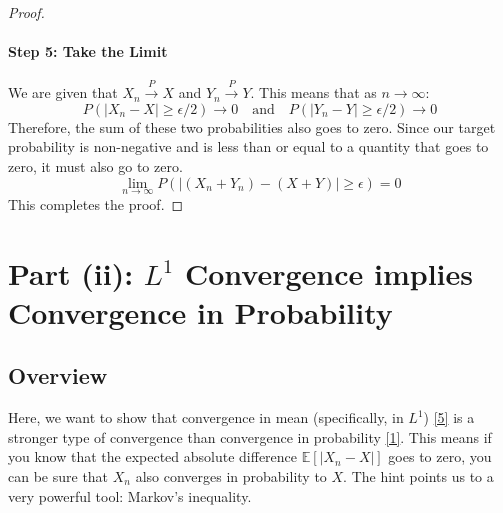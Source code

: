 \documentclass[11pt,a4paper]{article}
\theoremstyle{exercise}
\newcommand{\inDepthNote}[2]{\hyperref[#1]{[#2]}}
\begin{document}
\begin{proof}
\paragraph{Step 5: Take the Limit}
We are given that $X_n \xrightarrow{P} X$ and $Y_n \xrightarrow{P} Y$. This means that as $n \to \infty$:
\[
P\left( |X_n - X| \ge \epsilon/2 \right) \to 0 \quad \text{and} \quad P\left( |Y_n - Y| \ge \epsilon/2 \right) \to 0
\]
Therefore, the sum of these two probabilities also goes to zero. Since our target probability is non-negative and is less than or equal to a quantity that goes to zero, it must also go to zero.
\[
\lim_{n \to \infty} P\left( |(X_n + Y_n) - (X + Y)| \ge \epsilon \right) = 0
\]
This completes the proof.
\end{proof}

\section*{Part (ii): $L^1$ Convergence implies Convergence in Probability}

\subsection*{Overview}
Here, we want to show that convergence in mean (specifically, in $L^1$) \inDepthNote{note:l1-conv}{5} is a stronger type of convergence than convergence in probability \inDepthNote{note:prob-conv}{1}. This means if you know that the expected absolute difference $\mathbb{E}[|X_n - X|]$ goes to zero, you can be sure that $X_n$ also converges in probability to $X$. The hint points us to a very powerful tool: Markov's inequality.
\end{document}
